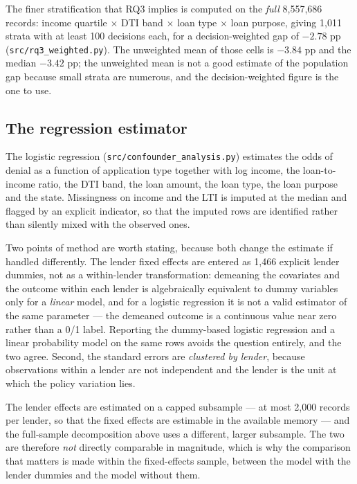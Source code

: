 \documentclass[sigconf,balance=false]{acmart}
\begin{document}
The finer stratification that RQ3 implies is computed on the \emph{full}
8{,}557{,}686 records: income quartile $\times$ DTI band $\times$ loan type
$\times$ loan purpose, giving 1{,}011 strata with at least 100 decisions
each, for a decision-weighted gap of $-2.78$ pp
(\texttt{src/rq3\_\allowbreak weighted.py}). The unweighted mean of those
cells is $-3.84$ pp and the median $-3.42$ pp; the unweighted mean is not a
good estimate of the population gap because small strata are numerous, and
the decision-weighted figure is the one to use.

\subsection{The regression estimator}

The logistic regression (\texttt{src/confounder\_\allowbreak analysis.py})
estimates the odds of denial as a function of application type together
with log income, the loan-to-income ratio, the DTI band, the loan amount,
the loan type, the loan purpose and the state. Missingness on income and
the LTI is imputed at the median and flagged by an explicit indicator, so
that the imputed rows are identified rather than silently mixed with the
observed ones.

Two points of method are worth stating, because both change the estimate if
handled differently. The lender fixed effects are entered as 1{,}466
explicit lender dummies, not as a within-lender transformation: demeaning
the covariates and the outcome within each lender is algebraically
equivalent to dummy variables only for a \emph{linear} model, and for a
logistic regression it is not a valid estimator of the same parameter ---
the demeaned outcome is a continuous value near zero rather than a 0/1
label. Reporting the dummy-based logistic regression and a linear
probability model on the same rows avoids the question entirely, and the
two agree. Second, the standard errors are \emph{clustered by lender},
because observations within a lender are not independent and the lender is
the unit at which the policy variation lies.

The lender effects are estimated on a capped subsample --- at most 2{,}000
records per lender, so that the fixed effects are estimable in the
available memory --- and the full-sample decomposition above uses a
different, larger subsample. The two are therefore \emph{not} directly
comparable in magnitude, which is why the comparison that matters is made
within the fixed-effects sample, between the model with the lender dummies
and the model without them.
\end{document}
